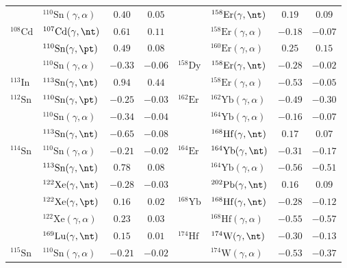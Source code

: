 {\begin{longtable}{llcc llcc}
$ $ & $^{110}\mathrm{Sn}(\gamma,\alpha)$ & $0.40$ & $0.05$ & $ $ & $^{158}\mathrm{Er}(\gamma,\nt)$ & $0.19$ & $0.09$ \\ 
$^{108}\mathrm{Cd}$ & $^{107}\mathrm{Cd}(\gamma,\nt)$ & $0.61$ & $0.11$ & $ $ & $^{158}\mathrm{Er}(\gamma,\alpha)$ & $-0.18$ & $-0.07$ \\ 
$ $ & $^{110}\mathrm{Sn}(\gamma,\pt)$ & $0.49$ & $0.08$ & $ $ & $^{160}\mathrm{Er}(\gamma,\alpha)$ & $0.25$ & $0.15$ \\ 
$ $ & $^{110}\mathrm{Sn}(\gamma,\alpha)$ & $-0.33$ & $-0.06$ & $^{158}\mathrm{Dy}$ & $^{158}\mathrm{Er}(\gamma,\nt)$ & $-0.28$ & $-0.02$ \\ 
$^{113}\mathrm{In}$ & $^{113}\mathrm{Sn}(\gamma,\nt)$ & $0.94$ & $0.44$ & $ $ & $^{158}\mathrm{Er}(\gamma,\alpha)$ & $-0.53$ & $-0.05$ \\ 
$^{112}\mathrm{Sn}$ & $^{110}\mathrm{Sn}(\gamma,\pt)$ & $-0.25$ & $-0.03$ & $^{162}\mathrm{Er}$ & $^{162}\mathrm{Yb}(\gamma,\alpha)$ & $-0.49$ & $-0.30$ \\ 
$ $ & $^{110}\mathrm{Sn}(\gamma,\alpha)$ & $-0.34$ & $-0.04$ & $ $ & $^{164}\mathrm{Yb}(\gamma,\alpha)$ & $-0.16$ & $-0.07$ \\ 
$ $ & $^{113}\mathrm{Sn}(\gamma,\nt)$ & $-0.65$ & $-0.08$ & $ $ & $^{168}\mathrm{Hf}(\gamma,\nt)$ & $0.17$ & $0.07$ \\ 
$^{114}\mathrm{Sn}$ & $^{110}\mathrm{Sn}(\gamma,\alpha)$ & $-0.21$ & $-0.02$ & $^{164}\mathrm{Er}$ & $^{164}\mathrm{Yb}(\gamma,\nt)$ & $-0.31$ & $-0.17$ \\ 
$ $ & $^{113}\mathrm{Sn}(\gamma,\nt)$ & $0.78$ & $0.08$ & $ $ & $^{164}\mathrm{Yb}(\gamma,\alpha)$ & $-0.56$ & $-0.51$ \\ 
$ $ & $^{122}\mathrm{Xe}(\gamma,\nt)$ & $-0.28$ & $-0.03$ & $ $ & $^{202}\mathrm{Pb}(\gamma,\nt)$ & $0.16$ & $0.09$ \\ 
$ $ & $^{122}\mathrm{Xe}(\gamma,\pt)$ & $0.16$ & $0.02$ & $^{168}\mathrm{Yb}$ & $^{168}\mathrm{Hf}(\gamma,\nt)$ & $-0.28$ & $-0.12$ \\ 
$ $ & $^{122}\mathrm{Xe}(\gamma,\alpha)$ & $0.23$ & $0.03$ & $ $ & $^{168}\mathrm{Hf}(\gamma,\alpha)$ & $-0.55$ & $-0.57$ \\ 
$ $ & $^{169}\mathrm{Lu}(\gamma,\nt)$ & $0.15$ & $0.01$ & $^{174}\mathrm{Hf}$ & $^{174}\mathrm{W}(\gamma,\nt)$ & $-0.30$ & $-0.13$ \\ 
$^{115}\mathrm{Sn}$ & $^{110}\mathrm{Sn}(\gamma,\alpha)$ & $-0.21$ & $-0.02$ & $ $ & $^{174}\mathrm{W}(\gamma,\alpha)$ & $-0.53$ & $-0.37$ \\ 

\end{longtable}}
